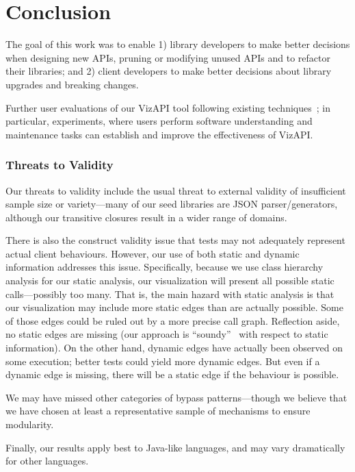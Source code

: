 \chapter{Conclusion}
The goal of this work was to enable 1) library developers to make better
decisions when designing new APIs, pruning or modifying unused APIs and to refactor their
libraries; and 2) client developers to make better decisions about library
upgrades and breaking changes.

Further user evaluations of our VizAPI tool following
existing techniques~\cite{merino18:_system_liter_review_softw_visual_evaluat}; in
particular, experiments, where users perform software
understanding and maintenance tasks can establish and improve the
effectiveness of VizAPI.


\subsection{Threats to Validity}
Our threats to validity include the usual threat to external validity
of insufficient sample size or variety---many of our seed libraries
are JSON parser/generators, although our transitive closures result in
a wider range of domains.

There is also the construct validity issue that tests may
not adequately represent actual client behaviours. However, our use of both static
and dynamic information addresses this issue. Specifically, because we use
class hierarchy analysis for our static analysis, our visualization will present
all possible static calls---possibly too many. 
That is, the main hazard with static analysis is that our visualization may include more
static edges than are actually possible. Some of those edges could be ruled out by a more
precise call graph. Reflection aside, no static edges
are missing (our approach is ``soundy''~\cite{livshits15:_in_defen_sound} with respect to static information). On the other hand, dynamic edges have actually been observed
on some execution; better tests could yield more dynamic edges. But even if
a dynamic edge is missing, there will be a static edge if the behaviour is possible.

We may have missed other categories of bypass patterns---though we believe
that we have chosen at least a representative sample of mechanisms to ensure
modularity. 

Finally, our results apply best to Java-like languages, and
may vary dramatically for other languages.

